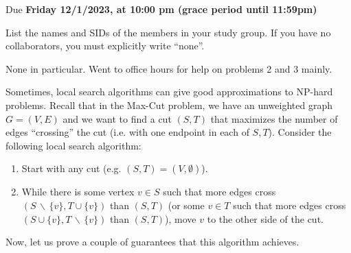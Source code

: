 \documentclass[11pt]{article}
\def\duedate{Friday 12/1/2023, at 10:00 pm (grace period until 11:59pm)}
\begin{document}
\maketitle

Due \textbf{\duedate}

List the names and SIDs of the members in your study group.
If you have no collaborators, you must explicitly write ``none''.

\begin{solution}
	None in particular. Went to office hours for help on problems 2 and 3 mainly.
\end{solution}

Sometimes, local search algorithms can give good approximations to NP-hard problems. Recall that in the Max-Cut problem, we have an unweighted graph $G=(V, E)$ and we want to find a cut $(S, T)$ that maximizes the number of edges ``crossing'' the cut (i.e. with one endpoint in each of $S, T$). Consider the following local search algorithm: 

\begin{enumerate}
    \item Start with any cut (e.g. $(S, T) = (V, \emptyset)$).
    \item While there is some vertex $v \in S$ such that more edges cross $(S \, \backslash \, \{v\}, T \cup \{v\})$ than $(S, T)$ (or some $v \in T$ such that more edges cross $(S \cup \{v\}, T \, \backslash \, \{v\})$ than $(S, T)$), move $v$ to the other side of the cut.
\end{enumerate}

Now, let us prove a couple of guarantees that this algorithm achieves.
\end{document}
